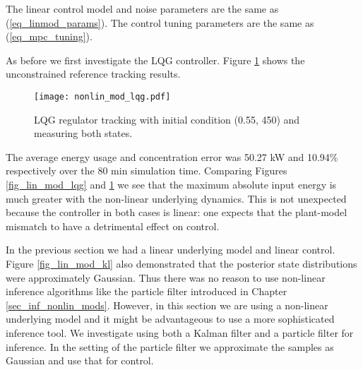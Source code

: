 The linear control model and noise parameters are the same as (\ref{eq_linmod_params}). The control tuning parameters are the same as (\ref{eq_mpc_tuning}).

As before we first investigate the LQG controller. Figure \ref{fig_nonlin_lqg} shows the unconstrained reference tracking results.
\begin{figure}[H] 
\centering
\texttt{[image: nonlin\_mod\_lqg.pdf]}
\caption{LQG regulator tracking with initial condition (0.55, 450) and measuring both states.}
\label{fig_nonlin_lqg}
\end{figure}
The average energy usage and concentration error was 50.27 kW and 10.94\% respectively over the 80 min simulation time. Comparing Figures \ref{fig_lin_mod_lqg} and \ref{fig_nonlin_lqg} we see that the maximum absolute input energy is much greater with the non-linear underlying dynamics. This is not unexpected because the controller in both cases is linear: one expects that the plant-model mismatch to have a detrimental effect on control.

In the previous section we had a linear underlying model and linear control. Figure \ref{fig_lin_mod_kl} also demonstrated that the posterior state distributions were approximately Gaussian. Thus there was no reason to use non-linear inference algorithms like the particle filter introduced in Chapter \ref{sec_inf_nonlin_mods}. However, in this section we are using a non-linear underlying model and it might be advantageous to use a more sophisticated inference tool. We investigate using both a Kalman filter and a particle filter for inference. In the setting of the particle filter we approximate the samples as Gaussian and use that for control.

